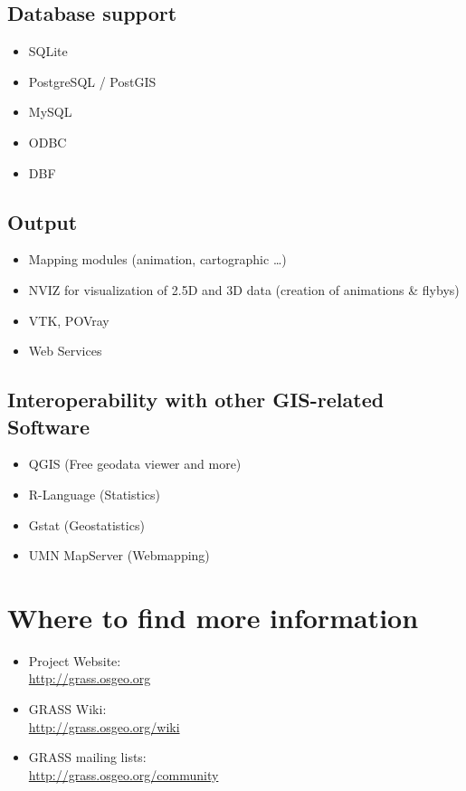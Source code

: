 \documentclass[notumble,a4paper,10pt,nofoldmark]{leaflet}
\newcommand{\GRASSurl}{\url{http://grass.osgeo.org}}
\begin{document}
\subsection{Database support}

\begin{itemize}
\item SQLite
\item PostgreSQL / PostGIS
\item MySQL
\item ODBC
\item DBF
\end{itemize}

\subsection{Output}

\begin{itemize}
\item Mapping modules (animation, cartographic \dots)
\item NVIZ for visualization of 2.5D and 3D data (creation of animations \& flybys)
\item VTK, POVray
\item Web Services
\end{itemize}

\subsection{Interoperability with other GIS-related Software}

\begin{itemize}
\item QGIS (Free geodata viewer and more)
\item R-Language (Statistics)
\item Gstat (Geostatistics)
\item UMN MapServer (Webmapping)
\end{itemize}

\section{Where to find more information}

\begin{itemize}
\item{Project Website: \\\GRASSurl}
\item{GRASS Wiki: \\\url{http://grass.osgeo.org/wiki}}
\item{GRASS mailing lists: \\\url{http://grass.osgeo.org/community}}
\end{itemize}
\end{document}

